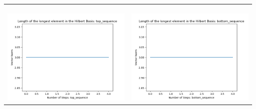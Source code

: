 \documentclass[10pt]{article}
\begin{document}
\begin{tabular}{c|c}
\begin{minipage}{.45\textwidth}
\end{minipage} \\ \\
\hline \\\begin{minipage}{.45\textwidth}
\includegraphics[width=\textwidth]{"DATA/4d/5 generators 2 bound B/top_sequence LENGTH"}
\end{minipage} &
\begin{minipage}{.45\textwidth}
\includegraphics[width=\textwidth]{"DATA/4d/5 generators 2 bound B bottomup/bottom_sequence LENGTH"}
\end{minipage}
\end{tabular}
\end{document}
